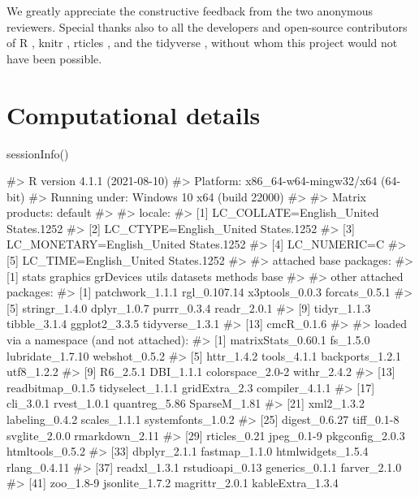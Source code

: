 We greatly appreciate the constructive feedback from the two anonymous
reviewers. Special thanks also to all the developers and open-source
contributors of R \citep{R}, knitr \citep{knitr1, knitr2}, rticles
\citep{rticles}, and the tidyverse \citep{tidyverse}, without whom this
project would not have been possible.

\hypertarget{computational-details}{%
\section{Computational details}\label{computational-details}}

\begin{Schunk}
\begin{Sinput}
sessionInfo()
\end{Sinput}
\begin{Soutput}
#> R version 4.1.1 (2021-08-10)
#> Platform: x86_64-w64-mingw32/x64 (64-bit)
#> Running under: Windows 10 x64 (build 22000)
#> 
#> Matrix products: default
#> 
#> locale:
#> [1] LC_COLLATE=English_United States.1252 
#> [2] LC_CTYPE=English_United States.1252   
#> [3] LC_MONETARY=English_United States.1252
#> [4] LC_NUMERIC=C                          
#> [5] LC_TIME=English_United States.1252    
#> 
#> attached base packages:
#> [1] stats     graphics  grDevices utils     datasets  methods   base     
#> 
#> other attached packages:
#>  [1] patchwork_1.1.1 rgl_0.107.14    x3ptools_0.0.3  forcats_0.5.1  
#>  [5] stringr_1.4.0   dplyr_1.0.7     purrr_0.3.4     readr_2.0.1    
#>  [9] tidyr_1.1.3     tibble_3.1.4    ggplot2_3.3.5   tidyverse_1.3.1
#> [13] cmcR_0.1.6     
#> 
#> loaded via a namespace (and not attached):
#>  [1] matrixStats_0.60.1 fs_1.5.0           lubridate_1.7.10   webshot_0.5.2     
#>  [5] httr_1.4.2         tools_4.1.1        backports_1.2.1    utf8_1.2.2        
#>  [9] R6_2.5.1           DBI_1.1.1          colorspace_2.0-2   withr_2.4.2       
#> [13] readbitmap_0.1.5   tidyselect_1.1.1   gridExtra_2.3      compiler_4.1.1    
#> [17] cli_3.0.1          rvest_1.0.1        quantreg_5.86      SparseM_1.81      
#> [21] xml2_1.3.2         labeling_0.4.2     scales_1.1.1       systemfonts_1.0.2 
#> [25] digest_0.6.27      tiff_0.1-8         svglite_2.0.0      rmarkdown_2.11    
#> [29] rticles_0.21       jpeg_0.1-9         pkgconfig_2.0.3    htmltools_0.5.2   
#> [33] dbplyr_2.1.1       fastmap_1.1.0      htmlwidgets_1.5.4  rlang_0.4.11      
#> [37] readxl_1.3.1       rstudioapi_0.13    generics_0.1.1     farver_2.1.0      
#> [41] zoo_1.8-9          jsonlite_1.7.2     magrittr_2.0.1     kableExtra_1.3.4  

\end{Soutput}
\end{Schunk}
